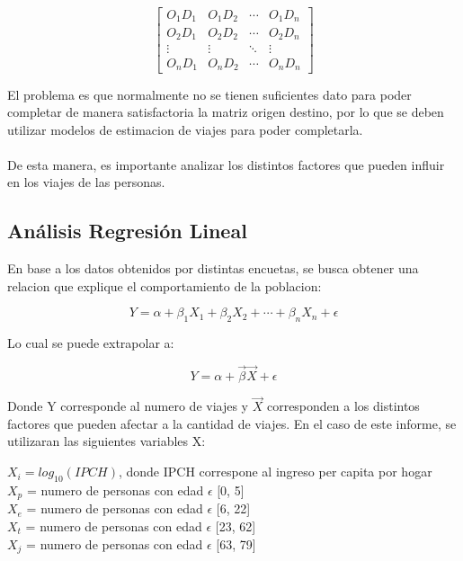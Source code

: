 \documentclass[12pt]{article} %
\begin{document}
\begin{equation}
    \begin{bmatrix}
        O_{1}D_{1} & O_{1}D_{2} & \cdots & O_{1}D_{n} \\
        O_{2}D_{1} & O_{2}D_{2} & \cdots & O_{2}D_{n} \\
        \vdots & \vdots & \ddots & \vdots \\
        O_{n}D_{1} & O_{n}D_{2} & \cdots & O_{n}D_{n}
    \end{bmatrix}
\end{equation}

El problema es que normalmente no se tienen suficientes dato para poder completar de manera satisfactoria la matriz origen destino, por lo que se deben utilizar modelos de estimacion de viajes para poder completarla.
\\ \\
De esta manera, es importante analizar los distintos factores que pueden influir en los viajes de las personas.

\subsection{Análisis Regresión Lineal}

En base a los datos obtenidos por distintas encuetas, se busca obtener una relacion que explique el comportamiento de la poblacion:

\begin{equation}
    Y = \alpha + \beta_{1}X_{1} + \beta_{2}X_{2} + \cdots + \beta_{n}X_{n} + \epsilon
\end{equation}

Lo cual se puede extrapolar a:

\begin{equation}
    Y = \alpha + \vec{\beta}\vec{X} + \epsilon
\end{equation}

Donde Y corresponde al numero de viajes y $\vec{X}$ corresponden a los distintos factores que pueden afectar a la cantidad de viajes. En el caso de este informe, se utilizaran las siguientes variables X:

\begin{center}
    $X_i = log_{10}(IPCH)$, donde IPCH correspone al ingreso per capita por hogar\\
    $X_p$ = numero de personas con edad $\epsilon$ [0, 5]\\
    $X_e$ = numero de personas con edad $\epsilon$ [6, 22]\\
    $X_t$ = numero de personas con edad $\epsilon$ [23, 62]\\
    $X_j$ = numero de personas con edad $\epsilon$ [63, 79]\\
\end{center}
\end{document}
